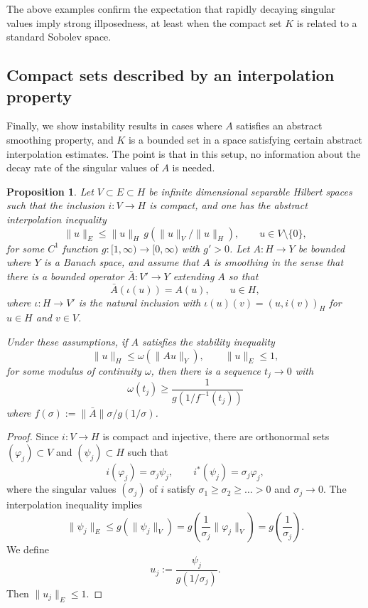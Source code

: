 \documentclass[12pt,twoside]{amsart}
\numberwithin{equation}{section}
\renewcommand{\leq}{\leqslant}
\renewcommand{\geq}{\geqslant}
\newtheorem{proposition}[theorem]{Proposition}
\newcommand{\norm}[1]{\lVert #1 \rVert}         %
\begin{document}
\begin{appendix}
The above examples confirm the expectation that rapidly decaying singular values imply strong illposedness, at least when the compact set $K$ is related to a standard Sobolev space. 



\subsection{Compact sets described by an interpolation property}

Finally, we show instability results in cases where $A$ satisfies an abstract smoothing property, and $K$ is a bounded set in a space satisfying certain abstract interpolation estimates. The point is that in this setup, no information about the decay rate of the singular values of $A$ is needed.


\begin{proposition} \label{prop_abstract_instability_triple}
Let $V \subset E \subset H$ be infinite dimensional separable Hilbert spaces such that the inclusion $i: V \to H$ is compact, and one has the abstract interpolation inequality 
\[
\norm{u}_E \leq \norm{u}_H \, g(\norm{u}_V/\norm{u}_H), \qquad u \in V \setminus \{0\},
\]
for some $C^1$ function $g:[1,\infty) \to [0,\infty)$ with $g' > 0$. Let $A: H \to Y$ be bounded where $Y$ is a Banach space, and assume that $A$ is smoothing in the sense that there is a bounded operator $\bar{A}: V' \to Y$ extending $A$ so that 
\[
\bar{A}(\iota(u)) = A(u), \qquad u \in H,
\]
where $\iota: H \to V'$ is the natural inclusion with $\iota(u)(v) = (u, i(v))_H$ for $u \in H$ and $v \in V$.

Under these assumptions, if $A$ satisfies the stability inequality 
\[
\norm{u}_H \leq \omega(\norm{Au}_Y), \qquad \norm{u}_E \leq 1,
\]
for some modulus of continuity $\omega$, then there is a sequence $t_j \to 0$ with 
\[
\omega(t_j) \geq \frac{1}{g(1/f^{-1}(t_j))}
\]
where $f(\sigma) := \norm{\bar{A}} \sigma/g(1/\sigma)$.
\end{proposition}
\begin{proof} 
Since $i: V \to H$ is compact and injective, there are orthonormal sets $(\varphi_j) \subset V$ and $(\psi_j) \subset H$ such that 
\[
i(\varphi_j) = \sigma_j \psi_j, \qquad i^*(\psi_j) = \sigma_j \varphi_j,
\]
where the singular values $(\sigma_j)$ of $i$ satisfy $\sigma_1 \geq \sigma_2 \geq \ldots > 0$ and $\sigma_j \to 0$. The interpolation inequality implies 
\[
\norm{\psi_j}_E \leq g(\norm{\psi_j}_V) = g(\frac{1}{\sigma_j} \norm{\varphi_j}_V) = g(\frac{1}{\sigma_j}).
\]
We define 
\[
u_j := \frac{\psi_j}{g(1/\sigma_j)}.
\]
Then $\norm{u_j}_E \leq 1$.


\end{proof}
\end{appendix}
\end{document}

